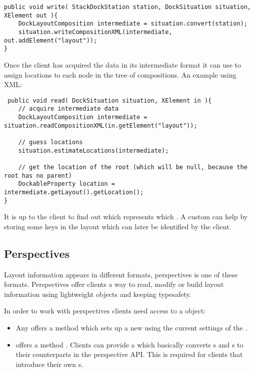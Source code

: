 \begin{lstlisting}
public void write( StackDockStation station, DockSituation situation, XElement out ){
	DockLayoutComposition intermediate = situation.convert(station);
	situation.writeCompositionXML(intermediate, out.addElement("layout"));
}
\end{lstlisting}

Once the client has acquired the data in its intermediate format it can use  to assign locations to each node in the tree of compositions. An example using XML:

\begin{lstlisting}
 public void read( DockSituation situation, XElement in ){
	// acquire intermediate data
	DockLayoutComposition intermediate = situation.readCompositionXML(in.getElement("layout"));

	// guess locations
	situation.estimateLocations(intermediate);

	// get the location of the root (which will be null, because the root has no parent)
	DockableProperty location = intermediate.getLayout().getLocation();
}
\end{lstlisting}

It is up to the client to find out which  represents which . A custom  can help by storing some keys in the layout which can later be identified by the client.




\subsection{Perspectives} \label{sec:perspectives}
Layout information appears in different formats, perspectives is one of these formats. Perspectives offer clients a way to read, modify or build layout information using lightweight objects and keeping typesafety.

In order to work with perspectives clients need access to a  object:
\begin{itemize}
 \item Any  offers a method  which sets up a new  using the current settings of the .
 \item {} offers a method . Clients can provide a  which basically converts s and s to their counterparts in the perspective API. This is required for clients that introduce their own s.
\end{itemize}

